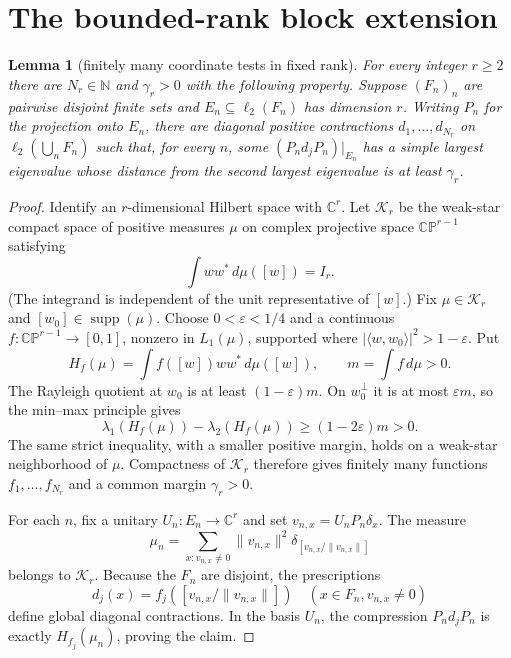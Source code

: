 \documentclass[11pt]{article}
\newtheorem{lemma}[theorem]{Lemma}
\newcommand{\ellTwo}{\ell_2}
\begin{document}
\section{The bounded-rank block extension}
\begin{lemma}[finitely many coordinate tests in fixed rank]\label{lem:fixedrank}
For every integer $r\geq2$ there are $N_r\in\mathbb N$ and
$\gamma_r>0$ with the following property.  Suppose $(F_n)_n$ are pairwise
disjoint finite sets and $E_n\subseteq\ellTwo(F_n)$ has dimension $r$.
Writing $P_n$ for the projection onto $E_n$, there are diagonal positive
contractions $d_1,\ldots,d_{N_r}$ on $\ellTwo(\bigcup_nF_n)$ such that, for
every $n$, some $(P_nd_jP_n)|_{E_n}$ has a simple largest eigenvalue whose
distance from the second largest eigenvalue is at least $\gamma_r$.
\end{lemma}
\begin{proof}
Identify an $r$-dimensional Hilbert space with $\mathbb C^r$.  Let
$\mathcal K_r$ be the weak-star compact space of positive measures $\mu$ on
complex projective space $\mathbb{CP}^{r-1}$ satisfying
\[
 \int ww^*\,d\mu([w])=I_r.
\]
(The integrand is independent of the unit representative of $[w]$.)
Fix $\mu\in\mathcal K_r$ and $[w_0]\in\operatorname{supp}(\mu)$.  Choose
$0<\varepsilon<1/4$ and a continuous $f:\mathbb{CP}^{r-1}\to[0,1]$,
nonzero in $L_1(\mu)$, supported where
$|\langle w,w_0\rangle|^2>1-\varepsilon$.  Put
\[
 H_f(\mu)=\int f([w])ww^*\,d\mu([w]),\qquad
 m=\int f\,d\mu>0.
\]
The Rayleigh quotient at $w_0$ is at least $(1-\varepsilon)m$.  On
$w_0^\perp$ it is at most $\varepsilon m$, so the min--max principle gives
\[
 \lambda_1(H_f(\mu))-\lambda_2(H_f(\mu))
 \geq(1-2\varepsilon)m>0.
\]
The same strict inequality, with a smaller positive margin, holds on a
weak-star neighborhood of $\mu$.  Compactness of $\mathcal K_r$ therefore
gives finitely many functions $f_1,\ldots,f_{N_r}$ and a common margin
$\gamma_r>0$.

For each $n$, fix a unitary $U_n:E_n\to\mathbb C^r$ and set
$v_{n,x}=U_nP_n\delta_x$.  The measure
\[
 \mu_n=\sum_{x:v_{n,x}\ne0}\|v_{n,x}\|^2
       \delta_{[v_{n,x}/\|v_{n,x}\|]}
\]
belongs to $\mathcal K_r$.  Because the $F_n$ are disjoint, the prescriptions
\[
 d_j(x)=f_j([v_{n,x}/\|v_{n,x}\|])\quad(x\in F_n, v_{n,x}\ne0)
\]
define global diagonal contractions.  In the basis $U_n$, the compression
$P_nd_jP_n$ is exactly $H_{f_j}(\mu_n)$, proving the claim.
\end{proof}
\end{document}

